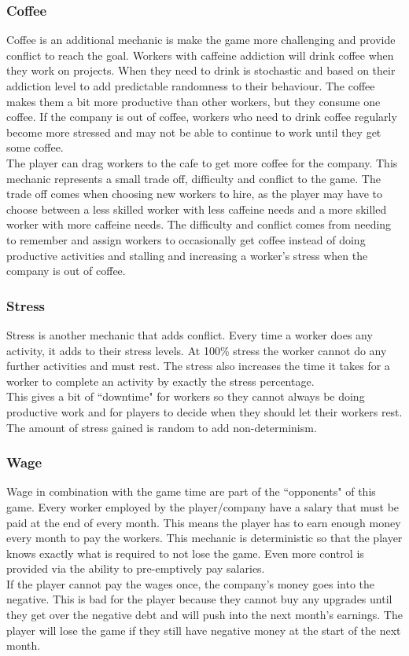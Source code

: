 \documentclass[11pt]{article}
\newcommand{\n}[0]{\\[\baselineskip]}
\begin{document}
\subsubsection{Coffee}
Coffee is an additional mechanic is make the game more challenging and provide conflict to reach the goal. Workers with caffeine addiction will drink coffee when they work on projects. When they need to drink is stochastic and based on their addiction level to add predictable randomness to their behaviour. The coffee makes them a bit more productive than other workers, but they consume one coffee. If the company is out of coffee, workers who need to drink coffee regularly become more stressed and may not be able to continue to work until they get some coffee. 
\n
The player can drag workers to the cafe to get more coffee for the company. This mechanic represents a small trade off, difficulty and conflict to the game. The trade off comes when choosing new workers to hire, as the player may have to choose between a less skilled worker with less caffeine needs and a more skilled worker with more caffeine needs. The difficulty and conflict comes from needing to remember and assign workers to occasionally get coffee instead of doing productive activities and stalling and increasing a worker's stress when the company is out of coffee. 

\subsubsection{Stress}
Stress is another mechanic that adds conflict. Every time a worker does any activity, it adds to their stress levels. At 100\% stress the worker cannot do any further activities and must rest. The stress also increases the time it takes for a worker to complete an activity by exactly the stress percentage. 
\n
This gives a bit of ``downtime" for workers so they cannot always be doing productive work and for players to decide when they should let their workers rest. The amount of stress gained is random to add non-determinism.

\subsubsection{Wage}
Wage in combination with the game time are part of the ``opponents" of this game. Every worker employed by the player/company have a salary that must be paid at the end of every month. This means the player has to earn enough money every month to pay the workers. This mechanic is deterministic so that the player knows exactly what is required to not lose the game. Even more control is provided via the ability to pre-emptively pay salaries. 
\n
If the player cannot pay the wages once, the company's money goes into the negative. This is bad for the player because they cannot buy any upgrades until they get over the negative debt and will push into the next month's earnings. The player will lose the game if they still have negative money at the start of the next month. 
\end{document}
